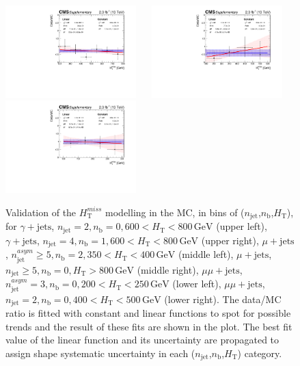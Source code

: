\clearpage
\begin{figure}[tbhp]
    \caption{ 
    Validation of the $H_{\mathrm{T}}^{miss}$ modelling in the MC, in bins of ($n_{\mathrm{jet}}$,$n_{\mathrm{b}}$,$H_{\mathrm{T}}$), for 
    $\gamma+\mathrm{jets}$,
    $n_{\mathrm{jet}}=2,n_{\mathrm{b}}=0,600<H_{\mathrm{T}}<800 \,
    \mathrm{GeV}$ (upper left),
    $\gamma+\mathrm{jets}$,
    $n_{\mathrm{jet}}=4,n_{\mathrm{b}}=1,600<H_{\mathrm{T}}<800 \,
    \mathrm{GeV}$ (upper right),
    $\mu+\mathrm{jets}$,
    $n_{\mathrm{jet}}^{asym}\geq5,n_{\mathrm{b}}=2,350<H_{\mathrm{T}}<400
    \, \mathrm{GeV}$ (middle left),
    $\mu+\mathrm{jets}$,
    $n_{\mathrm{jet}}\geq5,n_{\mathrm{b}}=0,H_{\mathrm{T}}>800 \,
    \mathrm{GeV}$ (middle right),
    $\mu\mu+\mathrm{jets}$,
    $n_{\mathrm{jet}}^{asym}=3,n_{\mathrm{b}}=0,200<H_{\mathrm{T}}<250
    \, \mathrm{GeV}$ (lower left),
    $\mu\mu+\mathrm{jets}$,
    $n_{\mathrm{jet}}=2,n_{\mathrm{b}}=0,400<H_{\mathrm{T}}<500 \,
    \mathrm{GeV}$ (lower right).
    The data/MC ratio is fitted with constant and linear functions to spot for possible 
    trends and the result of these fits are shown in the plot. The best fit value of the linear function and its uncertainty are propagated 
    to assign shape systematic uncertainty in each ($n_{\mathrm{jet}}$,$n_{\mathrm{b}}$,$H_{\mathrm{T}}$) category. 
    \label{fig:mht-validation} }
  \begin{center}
    \includegraphics[width=0.45\textwidth]{mht_eq0b_eq2j_ht_600_800_SinglePhoton_Graph_aux}  ~~
    \includegraphics[width=0.45\textwidth]{mht_eq1b_eq4j_ht_600_800_SinglePhoton_Graph_aux}  \\
    \includegraphics[width=0.45\textwidth]{mht_eq2b_ge5a_ht_350_400_SingleMu_Graph_aux}  ~~

\end{center}
\end{figure}
